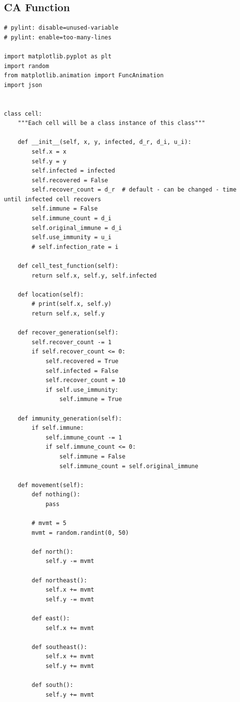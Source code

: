\documentclass[11pt, a4paper]{article}
\begin{document}
\subsection{CA Function}
\begin{lstlisting}
# pylint: disable=unused-variable
# pylint: enable=too-many-lines

import matplotlib.pyplot as plt
import random
from matplotlib.animation import FuncAnimation
import json


class cell:
    """Each cell will be a class instance of this class"""

    def __init__(self, x, y, infected, d_r, d_i, u_i):
        self.x = x
        self.y = y
        self.infected = infected
        self.recovered = False
        self.recover_count = d_r  # default - can be changed - time until infected cell recovers
        self.immune = False
        self.immune_count = d_i
        self.original_immune = d_i
        self.use_immunity = u_i
        # self.infection_rate = i

    def cell_test_function(self):
        return self.x, self.y, self.infected

    def location(self):
        # print(self.x, self.y)
        return self.x, self.y

    def recover_generation(self):
        self.recover_count -= 1
        if self.recover_count <= 0:
            self.recovered = True
            self.infected = False
            self.recover_count = 10
            if self.use_immunity:
                self.immune = True

    def immunity_generation(self):
        if self.immune:
            self.immune_count -= 1
            if self.immune_count <= 0:
                self.immune = False
                self.immune_count = self.original_immune

    def movement(self):
        def nothing():
            pass

        # mvmt = 5
        mvmt = random.randint(0, 50)

        def north():
            self.y -= mvmt

        def northeast():
            self.x += mvmt
            self.y -= mvmt

        def east():
            self.x += mvmt

        def southeast():
            self.x += mvmt
            self.y += mvmt

        def south():
            self.y += mvmt


\end{lstlisting}
\end{document}
